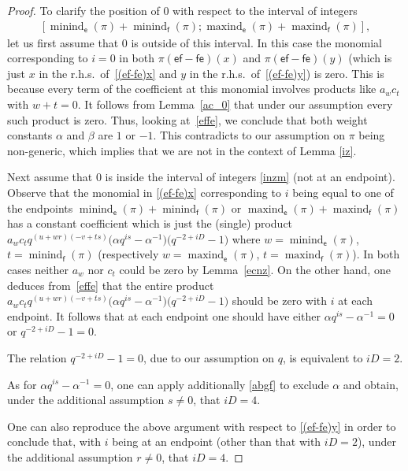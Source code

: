 \documentclass[10pt,a4paper]{amsart}
\numberwithin{equation}{section}
\begin{document}
\begin{proof} To clarify the position of $0$ with respect to the interval of integers
\begin{gather}\label{inzm}
[\operatorname{minind}_\mathsf{e}(\pi)+\operatorname{minind}_\mathsf{f}(\pi);\operatorname{maxind}_\mathsf{e}(\pi)+\operatorname{maxind}_\mathsf{f}(\pi)],
\end{gather}
let us first assume that $0$ is outside of this interval. In this case the monomial corresponding to $i=0$ in both $\pi(\mathsf{ef-fe})(x)$ and $\pi(\mathsf{ef-fe})(y)$ (which is just $x$ in the r.h.s.\ of~\eqref{(ef-fe)x} and $y$ in the r.h.s.\ of~\eqref{(ef-fe)y}) is zero. This is because every term of the coefficient at this monomial involves products like $a_wc_t$ with $w+t=0$. It follows from Lemma~\ref{ac_0} that under our assumption every such product is zero. Thus, looking at~\eqref{effe}, we conclude that both weight constants $\alpha$ and $\beta$ are $1$ or $-1$. This contradicts to our assumption on $\pi$ being non-generic, which implies that we are not in the context of Lemma \ref{iz}.

Next assume that $0$ is inside the interval of integers \eqref{inzm} (not at an endpoint). Observe that the monomial in \eqref{(ef-fe)x} corresponding to $i$ being equal to one of the endpoints $\operatorname{minind}_\mathsf{e}(\pi)+\operatorname{minind}_\mathsf{f}(\pi)$ or $\operatorname{maxind}_\mathsf{e}(\pi)+\operatorname{maxind}_\mathsf{f}(\pi)$ has a constant coefficient which is just the (single) product $a_wc_tq^{(u+wr)(-v+ts)}\big(\alpha q^{is}-\alpha^{-1}\big)\big(q^{-2+iD}-1\big)$ where $w=\operatorname{minind}_\mathsf{e}(\pi)$, $t=\operatorname{minind}_\mathsf{f}(\pi)$ (respectively $w=\operatorname{maxind}_\mathsf{e}(\pi)$, $t=\operatorname{maxind}_\mathsf{f}(\pi)$). In both cases neither $a_w$ nor $c_t$ could be zero by Lemma~\ref{ecnz}. On the other hand, one deduces from~\eqref{effe} that the entire product $a_wc_tq^{(u+wr)(-v+ts)}\big(\alpha q^{is}-\alpha^{-1}\big)\big(q^{-2+iD}-1\big)$ should be zero with $i$ at each endpoint. It follows that at each endpoint one should have either $\alpha q^{is}-\alpha^{-1}=0$ or $q^{-2+iD}-1=0$.

The relation $q^{-2+iD}-1=0$, due to our assumption on $q$, is equivalent to $iD=2$.

As for $\alpha q^{is}-\alpha^{-1}=0$, one can apply additionally \eqref{abgf} to exclude $\alpha$ and obtain, under the additional assumption $s\ne 0$, that $iD=4$.

One can also reproduce the above argument with respect to \eqref{(ef-fe)y} in order to conclude that, with $i$ being at an endpoint (other than that with $iD=2$), under the additional assumption $r\ne 0$, that $iD=4$.


\end{proof}
\end{document}
